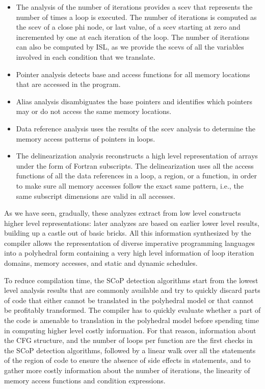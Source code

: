\documentclass{sigplanconf}
\begin{document}
\begin{itemize}
\item The analysis of the number of iterations \cite{scev} provides a scev that
  represents the number of times a loop is executed.  The number of iterations
  is computed as the scev of a close phi node, or last value, of a scev starting
  at zero and incremented by one at each iteration of the loop.  The number of
  iterations can also be computed by ISL, as we provide the scevs of all the
  variables involved in each condition that we translate.

\item Pointer analysis detects base and access functions for all memory
  locations that are accessed in the program.

\item Alias analysis disambiguates the base pointers and identifies which
  pointers may or do not access the same memory locations.

\item Data reference analysis uses the results of the scev analysis to determine
  the memory access patterns of pointers in loops.

\item The delinearization analysis \cite{delinearization1, delinearization2}
  reconstructs a high level representation of arrays under the form of Fortran
  subscripts.  The delinearization uses all the access functions of all the data
  references in a loop, a region, or a function, in order to make sure all
  memory accesses follow the exact same pattern, i.e., the same subscript
  dimensions are valid in all accesses.
\end{itemize}

As we have seen, gradually, these analyzes extract from low level constructs
higher level representations: later analyzes are based on earlier lower level
results, building up a castle out of basic bricks.  All this information
synthesized by the compiler allows the representation of diverse imperative
programming languages into a polyhedral form \cite{Girbal} containing a very
high level information of loop iteration domains, memory accesses, and static
and dynamic schedules.

To reduce compilation time, the SCoP detection algorithms start from the lowest
level analysis results that are commonly available and try to quickly discard
parts of code that either cannot be translated in the polyhedral model or that
cannot be profitably transformed.  The compiler has to quickly evaluate whether
a part of the code is amenable to translation in the polyhedral model before
spending time in computing higher level costly information.  For that reason,
information about the CFG structure, and the number of loops per function are
the first checks in the SCoP detection algorithms, followed by a linear walk
over all the statements of the region of code to ensure the absence of side
effects in statements, and to gather more costly information about the number of
iterations, the linearity of memory access functions and condition expressions.
\end{document}
